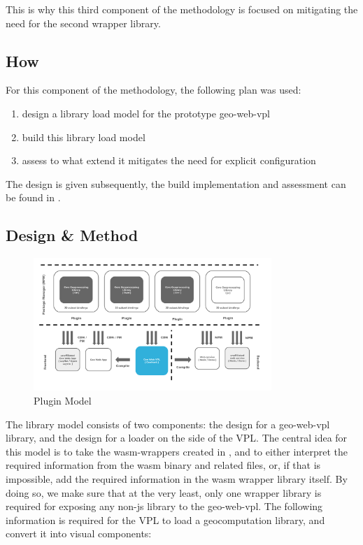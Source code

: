 This is why this third component of the methodology is focused on mitigating the need for the second wrapper library. 

\subsection{How}
For this component of the methodology, the following plan was used: 
\begin{enumerate}[-]
  \item design a library load model for the prototype \ac*{geo-web-vpl}
  \item build this library load model 
  \item assess to what extend it mitigates the need for explicit configuration
\end{enumerate}

The design is given subsequently, the build implementation and assessment can be found in .

\subsection{Design \& Method}

\begin{figure}
  \centering
  \graphicspath{ {../../assets/diagrams/} }
  \includegraphics[width=340px]{Model Proposal.png}
  \caption{Plugin Model}
  \label{fig:method}
\end{figure}

The library model consists of two components: the design for a geo-web-vpl library, and the design for a 
loader on the side of the VPL. 
The central idea for this model is to take the wasm-wrappers created in , and to either interpret the required information from the wasm binary and related files, or, if that is impossible, add the required information in the wasm wrapper library itself.
By doing so, we make sure that at the very least, only one wrapper library is required for exposing any non-js library to the \ac{geo-web-vpl}.
The following information is required for the VPL to load a geocomputation library, and convert it into visual components:

